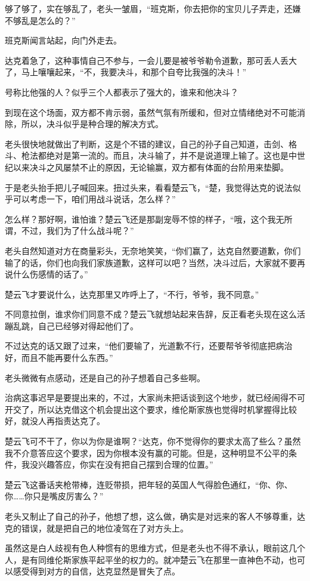 够了够了，实在够乱了，老头一皱眉，“班克斯，你去把你的宝贝儿子弄走，还嫌不够乱是怎么的？”

班克斯闻言站起，向门外走去。

达克着急了，这种事情自己不参与，一会儿要是被爷爷勒令道歉，那可丢人丢大了，马上嚷嚷起来，“不，我要决斗，和那个自夸比我强的决斗！”

号称比他强的人？似乎三个人都表示了强大的，谁来和他决斗？

到现在这个场面，双方都不肯示弱，虽然气氛有所缓和，但对立情绪绝对不可能消除，所以，决斗似乎是种合理的解决方式。

老头很快地就做出了判断，这是个不错的建议，自己的孙子自己知道，击剑、格斗、枪法都绝对是第一流的。而且，决斗输了，并不是说道理上输了。这也是中世纪以来决斗之风屡禁不止的原因，无论输赢，双方都有体面的台阶用来垫脚。

于是老头抬手把儿子喊回来。扭过头来，看看楚云飞，“楚，我觉得达克的说法似乎可以考虑一下，咱们用战斗说话，怎么样？”

怎么样？那好啊，谁怕谁？楚云飞还是那副宠辱不惊的样子，“哦，这个我无所谓，不过，我们为了什么战斗呢？”

老头自然知道对方在商量彩头，无奈地笑笑，“你们赢了，达克自然要道歉，你们输了的话，你们也向我们家族道歉，这样可以吧？当然，决斗过后，大家就不要再说什么伤感情的话了。”

楚云飞才要说什么，达克那里又咋呼上了，“不行，爷爷，我不同意。”

不同意拉倒，谁求你们同意不成？楚云飞就想站起来告辞，反正看老头现在这么活蹦乱跳，自己已经够对得起他们了。

不过达克的话又跟了过来，“他们要输了，光道歉不行，还要帮爷爷彻底把病治好，而且不能再要什么东西。”

老头微微有点感动，还是自己的孙子想着自己多些啊。

治病这事迟早是要提出来的，不过，大家尚未把话谈到这个地步，就已经闹得不可开交了，所以达克借这个机会提出这个要求，维伦斯家族也觉得时机掌握得比较好，就没人再指责达克了。

楚云飞可不干了，你以为你是谁啊？“达克，你不觉得你的要求太高了些么？虽然我不介意答应这个要求，因为你根本没有赢的可能。但是，这种明显不公平的条件，我没兴趣答应，你实在没有把自己摆到合理的位置。”

楚云飞这番话夹枪带棒，连贬带损，把年轻的英国人气得脸色通红，“你、你、你……你只是嘴皮厉害么？”

老头又制止了自己的孙子，他想了想，这么做，确实是对远来的客人不够尊重，达克的错误，就是把自己的地位凌驾在了对方头上。

虽然这是白人歧视有色人种惯有的思维方式，但是老头也不得不承认，眼前这几个人，是有同维伦斯家族平起平坐的权力的。就冲楚云飞在那里一直神色不动，也可以感受得到对方的自信，达克显然是冒失了点。

